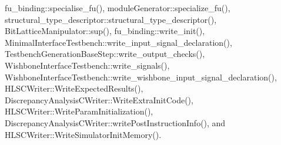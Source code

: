 fu\+\_\+binding\+::specialise\+\_\+fu(), module\+Generator\+::specialize\+\_\+fu(), structural\+\_\+type\+\_\+descriptor\+::structural\+\_\+type\+\_\+descriptor(), Bit\+Lattice\+Manipulator\+::sup(), fu\+\_\+binding\+::write\+\_\+init(), Minimal\+Interface\+Testbench\+::write\+\_\+input\+\_\+signal\+\_\+declaration(), Testbench\+Generation\+Base\+Step\+::write\+\_\+output\+\_\+checks(), Wishbone\+Interface\+Testbench\+::write\+\_\+signals(), Wishbone\+Interface\+Testbench\+::write\+\_\+wishbone\+\_\+input\+\_\+signal\+\_\+declaration(), H\+L\+S\+C\+Writer\+::\+Write\+Expected\+Results(), Discrepancy\+Analysis\+C\+Writer\+::\+Write\+Extra\+Init\+Code(), H\+L\+S\+C\+Writer\+::\+Write\+Param\+Initialization(), Discrepancy\+Analysis\+C\+Writer\+::write\+Post\+Instruction\+Info(), and H\+L\+S\+C\+Writer\+::\+Write\+Simulator\+Init\+Memory().

